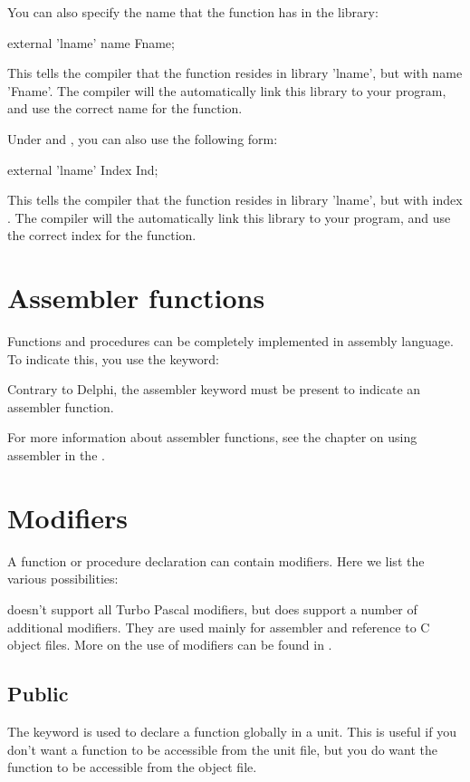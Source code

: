\documentclass{report}
\begin{document}
You can also specify the name that the function has in the library:
\begin{listing}
external 'lname' name Fname;
\end{listing}
This tells the compiler that the function resides in library 'lname', 
but with name 'Fname'. The compiler will the automatically link this 
library to your program, and use the correct name for the function.

Under \windows and \ostwo, you can also use the following form:
\begin{listing}
external 'lname' Index Ind;
\end{listing}
This tells the compiler that the function resides in library 'lname', 
but with index . The compiler will the automatically 
link this library to your program, and use the correct index for the
function. 

\section{Assembler functions}

Functions and procedures can be completely implemented in assembly
language. To indicate this, you use the  keyword:



Contrary to Delphi, the assembler keyword must be present to indicate an
assembler function.

For more information about assembler functions, see the chapter on using
assembler in the \progref.
 
\section{Modifiers}
A function or procedure declaration can contain modifiers. Here we list the
various possibilities:


\fpc doesn't support all Turbo Pascal modifiers, but
does support a number of additional modifiers. They are used mainly for assembler and
reference to C object files. More on the use of modifiers can be found in
\progref.

\subsection{Public}
The  keyword is used to declare a function globally in a unit.
This is useful if you don't want a function to be accessible from the unit
file, but you do want the function to be accessible from the object file.
\end{document}
